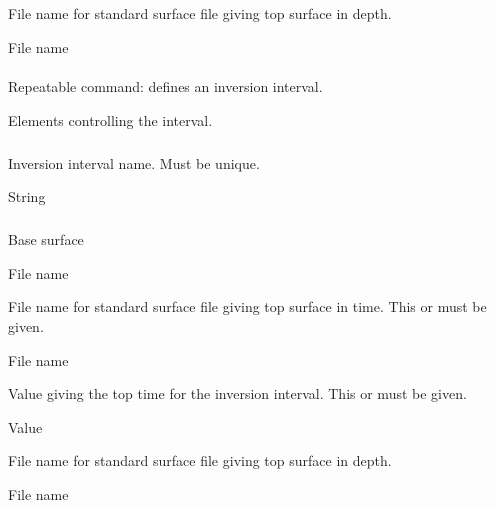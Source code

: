 \subparagraph{} 
 \slist
   \item \Description File name for standard surface file giving top surface in depth.
   \item \Argument File name
   \item \Default
 \elist

 
\paragraph{ \necessary}  
 \slist
 	\item \Description Repeatable command: defines an inversion interval.
 	\item \Argument Elements controlling the interval.
 	\item \Default
 \elist

 \subparagraph{ \necessary} 
 \slist
   \item \Description Inversion interval name. Must be unique.
   \item \Argument String
   \item \Default
 \elist

\subparagraph{ \necessary} 
 \slist
   \item \Description Base surface
   \item \Argument File name
   \item \Default
 \elist
 
 
 \slist
   \item \Description File name for standard surface file giving top surface in time. This or  must be given.
   \item \Argument File name
   \item \Default
 \elist

 
 \slist
   \item \Description Value giving the top time for the inversion interval. This or  must be given.
   \item \Argument Value
   \item \Default
 \elist

  
 \slist
   \item \Description File name for standard surface file giving top surface in depth.
   \item \Argument File name
   \item \Default
 \elist

